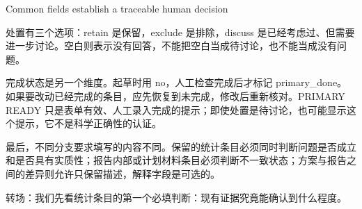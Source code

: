\documentclass[10pt,aspectratio=169]{beamer}
\begin{document}
\begin{frame}[t]{Common fields establish a traceable human decision}
{\par
处置有三个选项：retain 是保留，exclude 是排除，discuss 是已经考虑过、但需要进一步讨论。空白则表示没有回答，不能把空白当成待讨论，也不能当成没有问题。
\par
完成状态是另一个维度。起草时用 no，人工检查完成后才标记 primary\_done。如果要改动已经完成的条目，应先恢复到未完成，修改后重新核对。PRIMARY READY 只是表单有效、人工录入完成的提示；即使处置是待讨论，也可能显示这个提示，它不是科学正确性的认证。
\par
最后，不同分支要求填写的内容不同。保留的统计条目必须同时判断问题是否成立和是否具有实质性；报告内部或计划材料条目必须判断不一致状态；方案与报告之间的差异则允许只保留描述，解释字段是可选的。
\par
转场：我们先看统计条目的第一个必填判断：现有证据究竟能确认到什么程度。
}
\end{frame}
\end{document}
